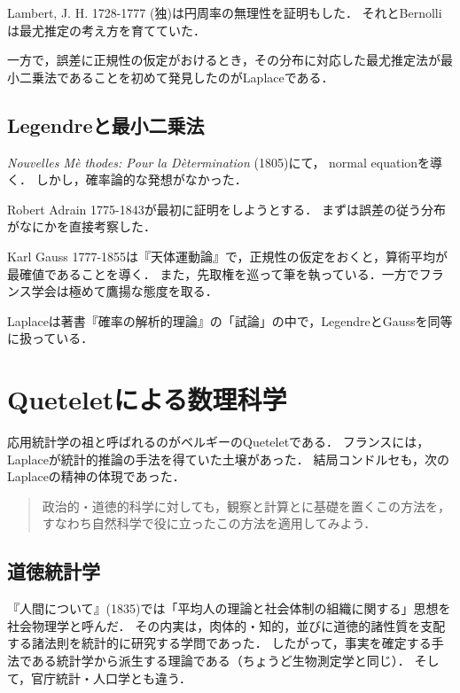 \documentclass[uplatex,dvipdfmx]{jsreport}
\begin{document}
Lambert, J. H. 1728-1777 (独)は円周率の無理性を証明もした．
それとBernolliは最尤推定の考え方を育てていた．

一方で，誤差に正規性の仮定がおけるとき，その分布に対応した最尤推定法が最小二乗法であることを初めて発見したのがLaplaceである．

\subsection{Legendreと最小二乗法}

\textit{Nouvelles M\`{e} thodes: Pour la D\`{e}termination} (1805)にて，
normal equationを導く．
しかし，確率論的な発想がなかった．

Robert Adrain 1775-1843が最初に証明をしようとする．
まずは誤差の従う分布がなにかを直接考察した．

Karl Gauss 1777-1855は『天体運動論』で，正規性の仮定をおくと，算術平均が最確値であることを導く．
また，先取権を巡って筆を執っている．一方でフランス学会は極めて鷹揚な態度を取る．

Laplaceは著書『確率の解析的理論』の「試論」の中で，LegendreとGaussを同等に扱っている．

\section{Queteletによる数理科学}

\begin{tcolorbox}[colframe=ForestGreen, colback=ForestGreen!10!white,breakable,colbacktitle=ForestGreen!40!white,coltitle=black,fonttitle=\bfseries\sffamily,
title=自然科学を回転させようとした試み]
    応用統計学の祖と呼ばれるのがベルギーのQueteletである．
    フランスには，Laplaceが統計的推論の手法を得ていた土壌があった．
    結局コンドルセも，次のLaplaceの精神の体現であった．
    \begin{quote}
        政治的・道徳的科学に対しても，観察と計算とに基礎を置くこの方法を，すなわち自然科学で役に立ったこの方法を適用してみよう．
    \end{quote}
\end{tcolorbox}

\subsection{道徳統計学}

『人間について』(1835)では「平均人の理論と社会体制の組織に関する」思想を社会物理学と呼んだ．
その内実は，肉体的・知的，並びに道徳的諸性質を支配する諸法則を統計的に研究する学問であった．
したがって，事実を確定する手法である統計学から派生する理論である（ちょうど生物測定学と同じ）．
そして，官庁統計・人口学とも違う．
\end{document}
